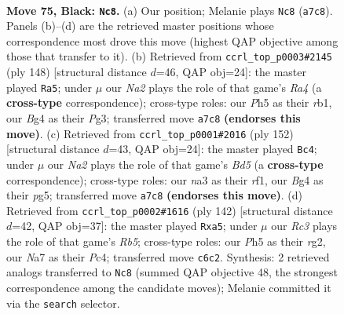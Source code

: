 \documentclass[11pt]{article}
\begin{document}
\clearpage

\begin{figure}[p]\centering
\begin{subfigure}{0.46\textwidth}\centering
\resizebox{\linewidth}{!}{%
\newchessgame
\chessboard[
  setfen={5k2/n1P4K/p1r5/P4p1p/4pBb1/N5P1/8/R7 b - - 57 75},
  showmover=false,
  pgfstyle=straightmove, color=movearrow, markmove={a7-c8}
]}
\caption{}
\end{subfigure}\hfill
\begin{subfigure}{0.46\textwidth}\centering
\resizebox{\linewidth}{!}{%
\newchessgame
\chessboard[
  setfen={8/4k1p1/4b1Bp/5p1P/R4P2/6P1/6K1/1r6 w - - 17 75},
  showmover=false,
  pgfstyle=straightmove, color=movearrow, markmove={a4-a5}
]}
\caption{}
\end{subfigure}
\\[4pt]
\begin{subfigure}{0.46\textwidth}\centering
\resizebox{\linewidth}{!}{%
\newchessgame
\chessboard[
  setfen={5k2/1R6/1p5p/3B2p1/P2b2P1/1P4KP/8/5r2 w - - 49 77},
  showmover=false,
  pgfstyle=straightmove, color=movearrow, markmove={d5-c4}
]}
\caption{}
\end{subfigure}\hfill
\begin{subfigure}{0.46\textwidth}\centering
\resizebox{\linewidth}{!}{%
\newchessgame
\chessboard[
  setfen={8/8/8/pRpBp1k1/P1PbP3/8/KP4r1/8 w - - 2 72},
  showmover=false,
  pgfstyle=straightmove, color=movearrow, markmove={b5-a5}
]}
\caption{}
\end{subfigure}
\caption{\textbf{Move 75, Black: \texttt{Nc8}.} (a) Our position; Melanie plays \texttt{Nc8} (\texttt{a7c8}). Panels (b)--(d) are the retrieved master positions whose correspondence most drove this move (highest QAP objective among those that transfer to it). (b) Retrieved from \texttt{ccrl\_top\_p0003\#2145} (ply 148) [structural distance $d$=46, QAP obj=24]: the master played \texttt{Ra5}; under $\mu$ our \emph{Na2} plays the role of that game's \emph{Ra4} (a \textbf{cross-type} correspondence); cross-type roles: our \emph{P}h5 as their \emph{r}b1, our \emph{B}g4 as their \emph{P}g3; transferred move \texttt{a7c8} \textbf{(endorses this move)}. (c) Retrieved from \texttt{ccrl\_top\_p0001\#2016} (ply 152) [structural distance $d$=43, QAP obj=24]: the master played \texttt{Bc4}; under $\mu$ our \emph{Na2} plays the role of that game's \emph{Bd5} (a \textbf{cross-type} correspondence); cross-type roles: our \emph{n}a3 as their \emph{r}f1, our \emph{B}g4 as their \emph{p}g5; transferred move \texttt{a7c8} \textbf{(endorses this move)}. (d) Retrieved from \texttt{ccrl\_top\_p0002\#1616} (ply 142) [structural distance $d$=42, QAP obj=37]: the master played \texttt{Rxa5}; under $\mu$ our \emph{Rc3} plays the role of that game's \emph{Rb5}; cross-type roles: our \emph{P}h5 as their \emph{r}g2, our \emph{N}a7 as their \emph{P}c4; transferred move \texttt{c6c2}. Synthesis: 2 retrieved analogs transferred to \texttt{Nc8} (summed QAP objective 48, the strongest correspondence among the candidate moves); Melanie committed it via the \texttt{search} selector.}
\label{fig:thought-m149}
\end{figure}
\end{document}
